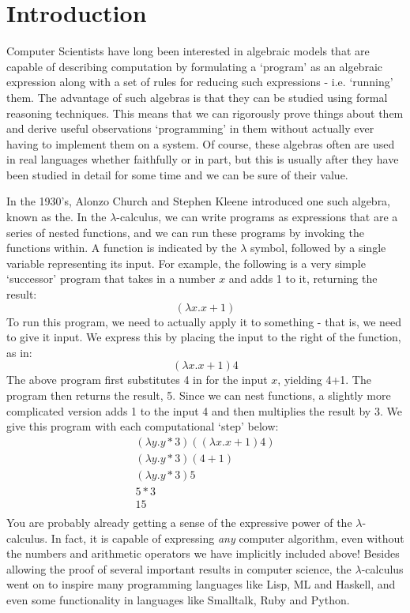 \chapter{Introduction}
	Computer Scientists have long been interested in algebraic models that are capable of describing computation by formulating a `program' as an algebraic expression along with a set of rules for reducing such expressions - i.e. `running' them.  The advantage of such algebras is that they can be studied using formal reasoning techniques.  This means that we can rigorously prove things about them and derive useful observations `programming' in them without actually ever having to implement them on a system.  Of course, these algebras often are used in real languages whether faithfully or in part, but this is usually after they have been studied in detail for some time and we can be sure of their value.
	
	In the 1930's, Alonzo Church and Stephen Kleene introduced one such algebra, known as the.  In the $\lambda$-calculus, we can write programs as expressions that are a series of nested functions, and we can run these programs by invoking the functions within.  A function is indicated by the $\lambda$ symbol, followed by a single variable representing its input.  For example, the following is a very simple `successor' program that takes in a number $x$ and adds 1 to it, returning the result:
	\[
		(\lambda x. x + 1)
	\]
To run this program, we need to actually apply it to something - that is, we need to give it input.  We express this by placing the input to the right of the function, as in:
\[
	(\lambda x. x + 1) 4
\]
The above program first substitutes 4 in for the input $x$, yielding 4+1.  The program then returns the result, 5.  Since we can nest functions, a slightly more complicated version adds 1 to the input 4 and then multiplies the result by 3.  We give this program with each computational `step' below:
\begin{align*}
	(\lambda y. y * 3) ((\lambda x. x + 1) 4)\\
	(\lambda y. y * 3) (4+1)\\
	(\lambda y. y * 3) 5\\
	5 * 3\\
	15\\
\end{align*}
You are probably already getting a sense of the expressive power of the $\lambda$-calculus.  In fact, it is capable of expressing \emph{any} computer algorithm, even without the numbers and arithmetic operators we have implicitly included above!  Besides allowing the proof of several important results in computer science, the $\lambda$-calculus went on to inspire many programming languages like Lisp, ML and Haskell, and even some functionality in languages like Smalltalk, Ruby and Python.

